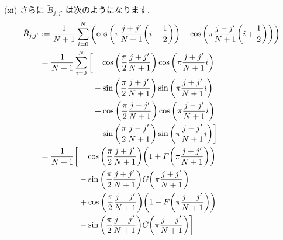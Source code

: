\documentclass[a4paper,dvipdfmx]{jsarticle}
\theoremstyle{definition}
\begin{document}
(xi) さらに $\tilde{B}_{j,j'}$ は次のようになります.
\begin{align}
  \tilde{B}_{j,j'} & := \frac{1}{N+1}\sum_{i=0}^{N}\qty(\cos\qty(\pi\frac{j + j'}{N+1}\qty(i + \frac{1}{2})) + \cos\qty(\pi\frac{j - j'}{N+1}\qty(i + \frac{1}{2}))) \\
                   & \ \begin{aligned}
                         = \frac{1}{N+1}\sum_{i=0}^{N}\bigg[ & \quad\cos\qty(\frac{\pi}{2}\frac{j + j'}{N+1})\cos\qty(\pi\frac{j + j'}{N+1}i)    \\
                                                             & - \sin\qty(\frac{\pi}{2}\frac{j + j'}{N+1})\sin\qty(\pi\frac{j + j'}{N+1}i)       \\
                                                             & + \cos\qty(\frac{\pi}{2}\frac{j - j'}{N+1})\cos\qty(\pi\frac{j - j'}{N+1}i)       \\
                                                             & - \sin\qty(\frac{\pi}{2}\frac{j - j'}{N+1})\sin\qty(\pi\frac{j - j'}{N+1}i)\bigg]
                       \end{aligned}                                          \\
                   & \ \begin{aligned}
                         = \frac{1}{N+1}\bigg[ & \quad\cos\qty(\frac{\pi}{2}\frac{j + j'}{N+1})\qty(1 + F\qty(\pi\frac{j + j'}{N+1})) \\
                                               & - \sin\qty(\frac{\pi}{2}\frac{j + j'}{N+1})G\qty(\pi\frac{j + j'}{N+1})              \\
                                               & + \cos\qty(\frac{\pi}{2}\frac{j - j'}{N+1})\qty(1 + F\qty(\pi\frac{j - j'}{N+1}))    \\
                                               & - \sin\qty(\frac{\pi}{2}\frac{j - j'}{N+1})G\qty(\pi\frac{j - j'}{N+1})\bigg]
                       \end{aligned}
\end{align}
\end{document}
